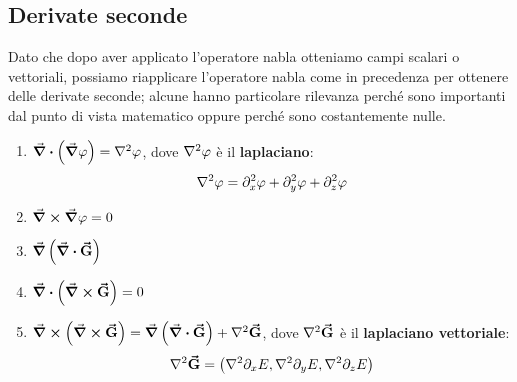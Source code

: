 \subsection{Derivate seconde}
Dato che dopo aver applicato l'operatore nabla otteniamo campi scalari o vettoriali, possiamo riapplicare l'operatore nabla come in precedenza per ottenere delle derivate seconde; alcune hanno particolare rilevanza perché sono importanti dal punto di vista matematico oppure perché sono costantemente nulle.
\begin{enumerate}[label=\roman*)]
	\item  $\div{\left(\grad\phi\right)}=\laplacian{\phi}$, dove $\laplacian{\phi}$ è il \textbf{laplaciano}:
	\begin{equation}
		\laplacian{\phi}=\partial^2_x\phi+\partial^2_y\phi+\partial^2_z\phi\label{laplacianocartesiano}
	\end{equation}
	\item $\curl{\grad{\varphi}}=0$
	\item $\grad{\left(\div{\vb*{\va{G}}}\right)}$
	\item $\div{\left(\curl{\vb*{\va{G}}}\right)}=0$
	\item $\curl{\left(\curl{\vba{G}}\right)}=\grad{\left(\div{\vba{G}}\right)}+\laplacian{\vba{G}}$, dove $\laplacian{\vba{G}}$ è il \textbf{laplaciano vettoriale}:
	\begin{equation}
		\laplacian{\vba{G}}=\left(\laplacian{\partial_xE},\laplacian{\partial_yE},\laplacian{\partial_zE}\right)
	\end{equation}
\end{enumerate}

